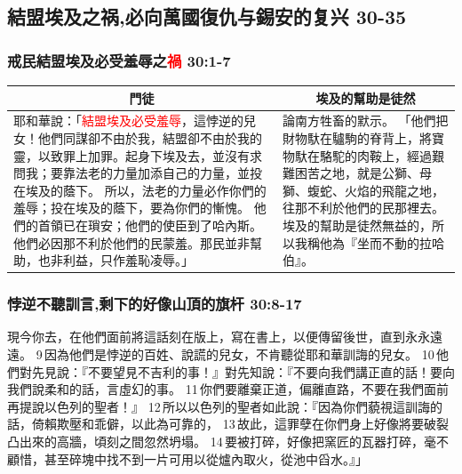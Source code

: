 \subsection{結盟埃及之祸,必向萬國復仇与錫安的复兴 30-35}
\subsubsection{戒民結盟埃及必受羞辱之\textcolor{red}{禍} 30:1-7}
\begin{table}[H]
\centering
\begin{tabular}{p{9.75cm}|p{7.50cm}}\hline\hline
\multicolumn{1}{c|}{門徒}&\multicolumn{1}{c}{埃及的幫助是徒然}\\\hline
耶和華說：「\textcolor{red}{結盟埃及必受羞辱}，這悖逆的兒女！他們同謀卻不由於我，結盟卻不由於我的靈，以致罪上加罪。起身下埃及去，並沒有求問我；要靠法老的力量加添自己的力量，並投在埃及的蔭下。
所以，法老的力量必作你們的羞辱；投在埃及的蔭下，要為你們的慚愧。
他們的首領已在瑣安；他們的使臣到了哈內斯。
他們必因那不利於他們的民蒙羞。那民並非幫助，也非利益，只作羞恥凌辱。」
&論南方牲畜的默示。
「他們把財物馱在驢駒的脊背上，將寶物馱在駱駝的肉鞍上，經過艱難困苦之地，就是公獅、母獅、蝮蛇、火焰的飛龍之地，往那不利於他們的民那裡去。埃及的幫助是徒然無益的，所以我稱他為『坐而不動的拉哈伯』。\\\hline
\end{tabular}
\end{table}


\subsubsection{悖逆不聽訓言,剩下的好像山頂的旗杆 30:8-17}
現今你去，在他們面前將這話刻在版上，寫在書上，以便傳留後世，直到永永遠遠。 9 因為他們是悖逆的百姓、說謊的兒女，不肯聽從耶和華訓誨的兒女。 10 他們對先見說：『不要望見不吉利的事！』對先知說：『不要向我們講正直的話！要向我們說柔和的話，言虛幻的事。 11 你們要離棄正道，偏離直路，不要在我們面前再提說以色列的聖者！』 12 所以以色列的聖者如此說：『因為你們藐視這訓誨的話，倚賴欺壓和乖僻，以此為可靠的， 13 故此，這罪孽在你們身上好像將要破裂凸出來的高牆，頃刻之間忽然坍塌。 14 要被打碎，好像把窯匠的瓦器打碎，毫不顧惜，甚至碎塊中找不到一片可用以從爐內取火，從池中舀水。』」

